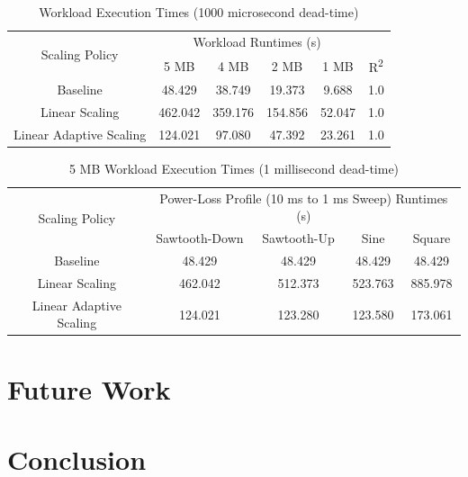 \documentclass[journal, twoside]{IEEEtran}
\begin{document}
\begin{table}
    \renewcommand{\arraystretch}{1.3} %
    \caption{Workload Execution Times (1000 microsecond dead-time)}
    \label{workload-size-performance}
    \centering
    \begin{tabular}{c||c|c|c|c|c}
        \hline
        \multirow{2}{*}{Scaling Policy} & \multicolumn{4}{c|}{Workload Runtimes (s)}\\\cline{2-6}
        {} & {5 MB} & {4 MB} & {2 MB} & {1 MB} & {R\textsuperscript{2}}\\
        \hline
        \hline
        {Baseline}                  &  {48.429} &  {38.749} &  {19.373} &   {9.688} & {1.0}\\
        {Linear Scaling}            & {462.042} & {359.176} & {154.856} &  {52.047} & {1.0}\\
        {Linear Adaptive Scaling}   & {124.021} &  {97.080} &  {47.392} &  {23.261} & {1.0}\\
        \hline
    \end{tabular}
\end{table}

\begin{table}
    \renewcommand{\arraystretch}{1.3} %
    \caption{5 MB Workload Execution Times (1 millisecond dead-time)}
    \label{power-loss-profile-performance}
    \centering
    \begin{tabular}{c||c|c|c|c}
        \hline
        \multirow{2}{*}{Scaling Policy} & \multicolumn{4}{c}{Power-Loss Profile (10 ms to 1 ms Sweep) Runtimes (s)} \\\cline{2-5}
        {} & {Sawtooth-Down} & {Sawtooth-Up} & {Sine} & {Square}\\
        \hline
        \hline
        {Baseline}                  &  {48.429} &  {48.429} &  {48.429} &  {48.429}\\
        {Linear Scaling}            & {462.042} & {512.373} & {523.763} & {885.978}\\
        {Linear Adaptive Scaling}   & {124.021} & {123.280} & {123.580} & {173.061}\\
        \hline
    \end{tabular}
\end{table}

\section{Future Work}

\lipsum[4]

\section{Conclusion}

\lipsum[2]



\end{document}
